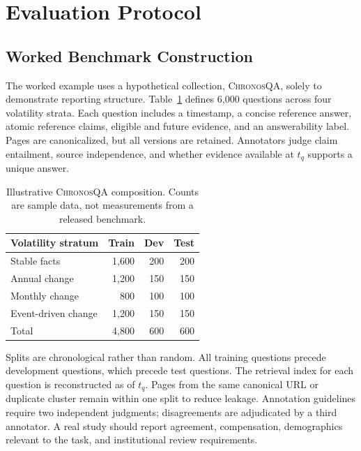 \section{Evaluation Protocol}
\label{sec:evaluation}

\subsection{Worked Benchmark Construction}

The worked example uses a hypothetical collection, \textsc{ChronosQA}, solely
to demonstrate reporting structure.  Table~\ref{tab:data} defines 6,000
questions across four volatility strata.  Each question includes a timestamp,
a concise reference answer, atomic reference claims, eligible and future
evidence, and an answerability label.  Pages are canonicalized, but all
versions are retained.  Annotators judge claim entailment, source independence,
and whether evidence available at $t_q$ supports a unique answer.

\begin{table}[t]
  \caption{Illustrative \textsc{ChronosQA} composition.  Counts are sample data,
  not measurements from a released benchmark.}
  \label{tab:data}
  \centering
  \small
  \begin{tabular}{@{}lrrr@{}}
    \toprule
    Volatility stratum & Train & Dev & Test \\
    \midrule
    Stable facts        & 1,600 & 200 & 200 \\
    Annual change       & 1,200 & 150 & 150 \\
    Monthly change      &   800 & 100 & 100 \\
    Event-driven change & 1,200 & 150 & 150 \\
    \midrule
    Total               & 4,800 & 600 & 600 \\
    \bottomrule
  \end{tabular}
\end{table}

Splits are chronological rather than random.  All training questions precede
development questions, which precede test questions.  The retrieval index for
each question is reconstructed as of $t_q$.  Pages from the same canonical URL
or duplicate cluster remain within one split to reduce leakage.  Annotation
guidelines require two independent judgments; disagreements are adjudicated by
a third annotator.  A real study should report agreement, compensation,
demographics relevant to the task, and institutional review requirements.

